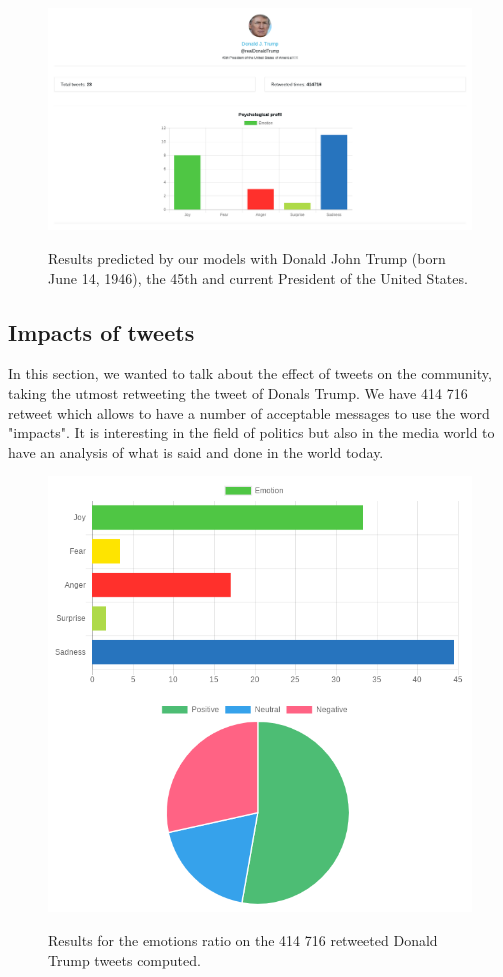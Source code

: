 \documentclass{acmtog} %
\begin{document}
\begin{figure}[h!]
{\includegraphics[width=\linewidth]{Trump-results-analysis_exemple.png}}
\caption{Results predicted by our models with Donald John Trump (born June 14, 1946), the 45th and current President of the United States.}
  \label{fig:trump_results}
\end{figure}


\subsection{Impacts of tweets}
\label{subsub:impacts_tweets}

In this section, we wanted to talk about the effect of tweets on the community, taking the utmost retweeting the tweet of Donals Trump. We have 414 716 retweet which allows to have a number of acceptable messages to use the word "impacts". It is interesting in the field of politics but also in the media world to have an analysis of what is said and done in the world today.


\begin{figure}[h!]
{\includegraphics[width=\linewidth]{retweeted_emotion_sentiment_trump-exemple.png}}
\caption{Results for the emotions ratio on the 414 716 retweeted Donald Trump tweets computed.}
  \label{fig:trump_results}
\end{figure}
\end{document}
